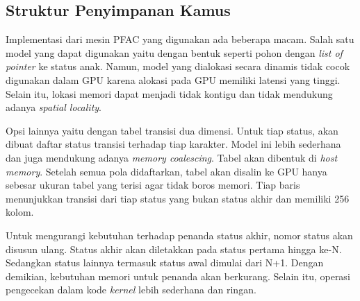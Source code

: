       
      
      \subsection{Struktur Penyimpanan Kamus}
      
      Implementasi dari mesin PFAC yang digunakan ada beberapa macam. Salah satu model yang dapat digunakan yaitu dengan bentuk seperti pohon dengan \emph{list of pointer} ke status anak. Namun, model yang dialokasi secara dinamis tidak cocok digunakan dalam GPU karena alokasi pada GPU memiliki latensi yang tinggi. Selain itu, lokasi memori dapat menjadi tidak kontigu dan tidak mendukung adanya \emph{spatial locality}.
      
      Opsi lainnya yaitu dengan tabel transisi dua dimensi. Untuk tiap status, akan dibuat daftar status transisi terhadap tiap karakter. Model ini lebih sederhana dan juga mendukung adanya \emph{memory coalescing}. Tabel akan dibentuk di \emph{host memory}. Setelah semua pola didaftarkan, tabel akan disalin ke GPU hanya sebesar ukuran tabel yang terisi agar tidak boros memori. Tiap baris menunjukkan transisi dari tiap status yang bukan status akhir dan memiliki 256 kolom.

      Untuk mengurangi kebutuhan terhadap penanda status akhir, nomor status akan disusun ulang. Status akhir akan diletakkan pada status pertama hingga ke-N. Sedangkan status lainnya termasuk status awal dimulai dari N+1. Dengan demikian, kebutuhan memori untuk penanda akan berkurang. Selain itu, operasi pengecekan dalam kode \emph{kernel} lebih sederhana dan ringan.

